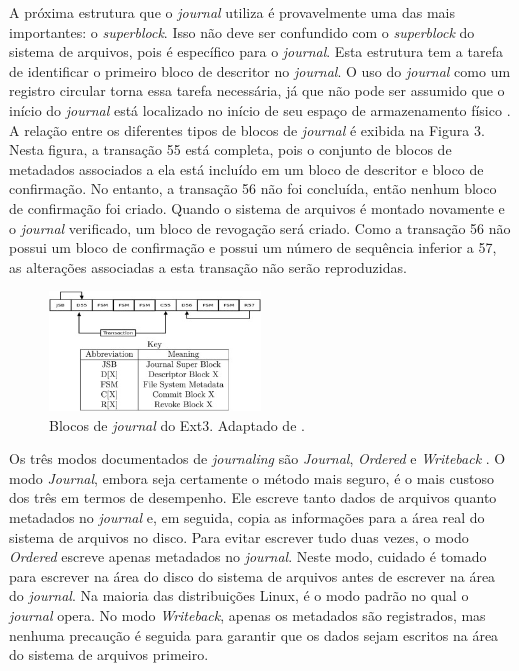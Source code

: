 \documentclass[
	12pt,				%
	openright,			%
	oneside,			%
	a4paper,			%
	chapter=TITLE,		%
	english,			%
	french,				%
	spanish,			%
	brazil				%
	]{abntex2}
\theoremstyle{definition}
\begin{document}
A próxima estrutura que o \textit{journal} utiliza é provavelmente uma das mais 
importantes: o \textit{superblock}. Isso não deve ser confundido com o 
\textit{superblock} do sistema de arquivos, pois é específico para o \textit{journal}. 
Esta estrutura tem a tarefa de identificar o primeiro bloco de descritor no \textit{journal}. 
O uso do \textit{journal} como um registro circular torna essa tarefa necessária, já 
que não pode ser assumido que o início do \textit{journal} está localizado no início de 
seu espaço de armazenamento físico \cite{carrier2005file}. A relação entre os diferentes 
tipos de blocos de \textit{journal} é exibida na Figura 3. Nesta figura, a transação 55 
está completa, pois o conjunto de blocos de metadados associados a ela está incluído em 
um bloco de descritor e bloco de confirmação. No entanto, a transação 56 não foi concluída, 
então nenhum bloco de confirmação foi criado. Quando o sistema de arquivos é montado 
novamente e o \textit{journal} verificado, um bloco de revogação será criado. Como a 
transação 56 não possui um bloco de confirmação e possui um número de sequência inferior 
a 57, as alterações associadas a esta transação não serão reproduzidas.

\begin{figure}[h]
    \centering
    \includegraphics[width=0.5\textwidth]{journalingf.jpg}
    \caption{Blocos de \textit{journal} do Ext3. Adaptado de \cite{carrier2005file}.}
    \label{fig:ext3_joual_blocks}
\end{figure}

Os três modos documentados de \textit{journaling} são \textit{Journal}, \textit{Ordered} e 
\textit{Writeback} \cite{bovet_cesati_2005}. O modo \textit{Journal}, embora seja certamente 
o método mais seguro, é o mais custoso dos três em termos de desempenho. Ele escreve tanto dados 
de arquivos quanto metadados no \textit{journal} e, em seguida, copia as informações para a área real do sistema de arquivos no disco. Para evitar escrever tudo duas vezes, o modo \textit{Ordered} escreve apenas metadados no \textit{journal}. Neste modo, cuidado é tomado para escrever na área do disco do sistema de arquivos antes de escrever na área do \textit{journal}. Na maioria das distribuições Linux, é o modo padrão no qual o \textit{journal} opera. No modo \textit{Writeback}, apenas os metadados são registrados, mas nenhuma precaução é seguida para garantir que os dados sejam escritos na área do sistema de arquivos primeiro.
\end{document}
